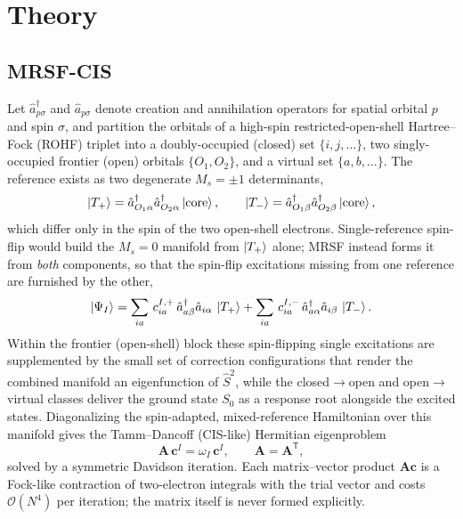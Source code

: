 \documentclass[aps,prb,reprint,superscriptaddress,floatfix]{revtex4-2}
\newcommand{\op}[1]{\hat{#1}}
\begin{document}
\section{Theory}\label{sec:theory}

\subsection{MRSF-CIS}

Let $\op{a}^\dagger_{p\sigma}$ and $\op{a}_{p\sigma}$ denote creation and
annihilation operators for spatial orbital $p$ and spin $\sigma$, and partition
the orbitals of a high-spin restricted-open-shell Hartree--Fock (ROHF) triplet
into a doubly-occupied (closed) set $\{i,j,\dots\}$, two singly-occupied frontier
(open) orbitals $\{O_1,O_2\}$, and a virtual set $\{a,b,\dots\}$. The reference
exists as two degenerate $M_s=\pm1$ determinants,
\begin{equation}
\ket{T_{+}}=\op{a}^\dagger_{O_1\alpha}\op{a}^\dagger_{O_2\alpha}\ket{\mathrm{core}},
\qquad
\ket{T_{-}}=\op{a}^\dagger_{O_1\beta}\op{a}^\dagger_{O_2\beta}\ket{\mathrm{core}},
\end{equation}
which differ only in the spin of the two open-shell electrons. Single-reference
spin-flip would build the $M_s=0$ manifold from $\ket{T_{+}}$ alone; MRSF instead
forms it from \emph{both} components, so that the spin-flip excitations missing
from one reference are furnished by the other,
\begin{equation}
\ket{\Psi_I}=\sum_{ia}\, c^{I,+}_{ia}\,
\op{a}^\dagger_{a\beta}\op{a}_{i\alpha}\,\ket{T_{+}}
+\sum_{ia}\, c^{I,-}_{ia}\,
\op{a}^\dagger_{a\alpha}\op{a}_{i\beta}\,\ket{T_{-}}.
\label{eq:mrsfstate}
\end{equation}
Within the frontier (open-shell) block these spin-flipping single excitations are
supplemented by the small set of correction configurations that render the
combined manifold an eigenfunction of $\op{S}^2$, while the closed$\to$open and
open$\to$virtual classes deliver the ground state $S_0$ as a response root
alongside the excited states. Diagonalizing the spin-adapted, mixed-reference
Hamiltonian over this manifold gives the Tamm--Dancoff (CIS-like) Hermitian
eigenproblem
\begin{equation}
\mathbf{A}\,\mathbf{c}^I=\omega_I\,\mathbf{c}^I,
\qquad \mathbf{A}=\mathbf{A}^{\mathsf{T}},
\label{eq:mrsf}
\end{equation}
solved by a symmetric Davidson iteration. Each matrix--vector product
$\mathbf{A}\mathbf{c}$ is a Fock-like contraction of two-electron integrals with
the trial vector and costs $\mathcal{O}(N^4)$ per iteration; the matrix itself is
never formed explicitly.
\end{document}
